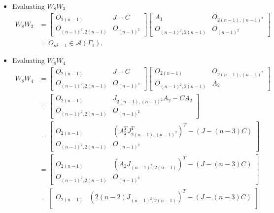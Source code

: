 \begin{itemize}
    \item Evaluating $W_8W_3$
    \begin{align*}
        W_8W_3
        &= \begin{bmatrix}
            O_{2(n-1)} & J-C \\
            O_{(n-1)^2, 2(n-1)} & O_{(n-1)^2}
        \end{bmatrix}\begin{bmatrix}
            A_1 & O_{2(n-1), (n-1)^2} \\
            O_{(n-1)^2, 2(n-1)} & O_{(n-1)^2}
        \end{bmatrix}\\
        &= O_{n^2-1}\in\mathcal{A}(\Gamma_1).
    \end{align*}
    
    \item Evaluating $W_8W_4$
    \begin{align*}
        W_8W_4
        &= \begin{bmatrix}
            O_{2(n-1)} & J-C \\
            O_{(n-1)^2, 2(n-1)} & O_{(n-1)^2}
        \end{bmatrix}\begin{bmatrix}
            O_{2(n-1)} & O_{2(n-1), (n-1)^2} \\
            O_{(n-1)^2, 2(n-1)} & A_2
        \end{bmatrix}\\
        &= \begin{bmatrix}
            O_{2(n-1)} & J_{2(n-1),(n-1)^2}A_2 -CA_2 \\
            O_{(n-1)^2, 2(n-1)} & O_{(n-1)^2}
        \end{bmatrix}\\
        &= \begin{bmatrix}
            O_{2(n-1)} & (A_2^TJ_{2(n-1),(n-1)^2}^T)^T -(J-(n-3)C) \\
            O_{(n-1)^2, 2(n-1)} & O_{(n-1)^2}
        \end{bmatrix}\\
        &= \begin{bmatrix}
            O_{2(n-1)} & (A_2J_{(n-1)^2,2(n-1)})^T -(J-(n-3)C) \\
            O_{(n-1)^2, 2(n-1)} & O_{(n-1)^2}
        \end{bmatrix}\\
        &= \begin{bmatrix}
            O_{2(n-1)} & (2(n-2)J_{(n-1)^2,2(n-1)})^T -(J-(n-3)C) \\

\end{bmatrix}
\end{align*}
\end{itemize}

